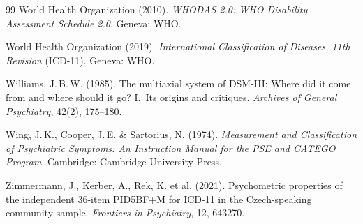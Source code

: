 \documentclass[11pt,a4paper]{article}
\begin{document}
\begin{thebibliography}{99}
World Health Organization (2010).
\newblock \textit{WHODAS 2.0: WHO Disability Assessment Schedule 2.0}.
\newblock Geneva: WHO.

World Health Organization (2019).
\newblock \textit{International Classification of Diseases, 11th Revision} (ICD-11).
\newblock Geneva: WHO.

Williams, J.\,B.\,W. (1985).
\newblock The multiaxial system of DSM-III: Where did it come from and where should it go? I.\ Its origins and critiques.
\newblock \textit{Archives of General Psychiatry}, 42(2), 175--180.

Wing, J.\,K., Cooper, J.\,E. \& Sartorius, N. (1974).
\newblock \textit{Measurement and Classification of Psychiatric Symptoms: An Instruction Manual for the PSE and CATEGO Program}.
\newblock Cambridge: Cambridge University Press.

Zimmermann, J., Kerber, A., Rek, K. et al. (2021).
\newblock Psychometric properties of the independent 36-item PID5BF+M for ICD-11 in the Czech-speaking community sample.
\newblock \textit{Frontiers in Psychiatry}, 12, 643270.

\end{thebibliography}
\end{document}
